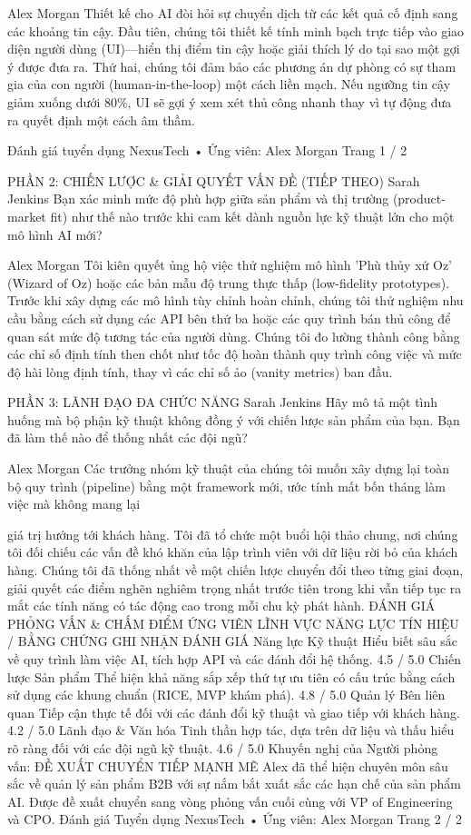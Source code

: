 \documentclass[12pt]{article}
\begin{document}
Alex Morgan
Thiết kế cho AI đòi hỏi sự chuyển dịch từ các kết quả cố định sang các khoảng tin cậy. Đầu tiên, chúng tôi thiết kế tính minh bạch trực tiếp vào giao diện người dùng (UI)—hiển thị điểm tin cậy hoặc giải thích lý do tại sao một gợi ý được đưa ra. Thứ hai, chúng tôi đảm bảo các phương án dự phòng có sự tham gia của con người (human-in-the-loop) một cách liền mạch. Nếu ngưỡng tin cậy giảm xuống dưới 80\%, UI sẽ gợi ý xem xét thủ công nhanh thay vì tự động đưa ra quyết định một cách âm thầm.

Đánh giá tuyển dụng NexusTech • Ứng viên: Alex Morgan
Trang 1 / 2

PHẦN 2: CHIẾN LƯỢC \& GIẢI QUYẾT VẤN ĐỀ (TIẾP THEO)
Sarah Jenkins
Bạn xác minh mức độ phù hợp giữa sản phẩm và thị trường (product-market fit) như thế nào trước khi cam kết dành nguồn lực kỹ thuật lớn cho một mô hình AI mới?

Alex Morgan
Tôi kiên quyết ủng hộ việc thử nghiệm mô hình 'Phù thủy xứ Oz' (Wizard of Oz) hoặc các bản mẫu độ trung thực thấp (low-fidelity prototypes). Trước khi xây dựng các mô hình tùy chỉnh hoàn chỉnh, chúng tôi thử nghiệm nhu cầu bằng cách sử dụng các API bên thứ ba hoặc các quy trình bán thủ công để quan sát mức độ tương tác của người dùng. Chúng tôi đo lường thành công bằng các chỉ số định tính then chốt như tốc độ hoàn thành quy trình công việc và mức độ hài lòng định tính, thay vì các chỉ số ảo (vanity metrics) ban đầu.

PHẦN 3: LÃNH ĐẠO ĐA CHỨC NĂNG
Sarah Jenkins
Hãy mô tả một tình huống mà bộ phận kỹ thuật không đồng ý với chiến lược sản phẩm của bạn. Bạn đã làm thế nào để thống nhất các đội ngũ?

Alex Morgan
Các trưởng nhóm kỹ thuật của chúng tôi muốn xây dựng lại toàn bộ quy trình (pipeline) bằng một framework mới, ước tính mất bốn tháng làm việc mà không mang lại

giá trị hướng tới khách hàng. Tôi đã tổ chức một buổi hội thảo chung, nơi chúng tôi đối chiếu các vấn đề khó khăn của lập trình viên với dữ liệu rời bỏ của khách hàng. Chúng tôi đã thống nhất về một chiến lược chuyển đổi theo từng giai đoạn, giải quyết các điểm nghẽn nghiêm trọng nhất trước tiên trong khi vẫn tiếp tục ra mắt các tính năng có tác động cao trong mỗi chu kỳ phát hành.
ĐÁNH GIÁ PHỎNG VẤN \& CHẤM ĐIỂM ỨNG VIÊN
LĨNH VỰC NĂNG LỰC
TÍN HIỆU / BẰNG CHỨNG GHI NHẬN
ĐÁNH GIÁ
Năng lực Kỹ thuật
Hiểu biết sâu sắc về quy trình làm việc AI, tích hợp API và các đánh đổi hệ thống.
4.5 /
5.0
Chiến lược Sản phẩm
Thể hiện khả năng sắp xếp thứ tự ưu tiên có cấu trúc bằng cách sử dụng các khung chuẩn (RICE, MVP khám phá).
4.8 /
5.0
Quản lý Bên liên quan
Tiếp cận thực tế đối với các đánh đổi kỹ thuật và giao tiếp với khách hàng.
4.2 /
5.0
Lãnh đạo \&
Văn hóa
Tinh thần hợp tác, dựa trên dữ liệu và thấu hiểu rõ ràng đối với các đội ngũ kỹ thuật.
4.6 /
5.0
Khuyến nghị của Người phỏng vấn: ĐỀ XUẤT CHUYỂN TIẾP MẠNH MẼ
Alex đã thể hiện chuyên môn sâu sắc về quản lý sản phẩm B2B với sự nắm bắt xuất sắc các hạn chế của sản phẩm AI. Được đề xuất chuyển sang vòng phỏng vấn cuối cùng với VP of Engineering và CPO.
Đánh giá Tuyển dụng NexusTech • Ứng viên: Alex Morgan
Trang 2 / 2
\end{document}

